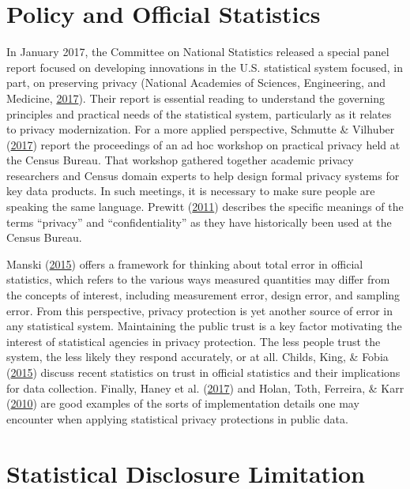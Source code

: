 \documentclass[]{article}
\begin{document}
\hypertarget{policy-and-official-statistics}{\section{Policy and
Official Statistics}\label{policy-and-official-statistics}}

In January 2017, the Committee on National Statistics released a special
panel report focused on developing innovations in the U.S. statistical
system focused, in part, on preserving privacy (National Academies of
Sciences, Engineering, and Medicine,
\protect\hyperlink{ref-groves:harris-kojetin:2017}{2017}). Their report
is essential reading to understand the governing principles and
practical needs of the statistical system, particularly as it relates to
privacy modernization. For a more applied perspective, Schmutte \&
Vilhuber (\protect\hyperlink{ref-Proc:NSF-Sloan:2017}{2017}) report the
proceedings of an ad hoc workshop on practical privacy held at the
Census Bureau. That workshop gathered together academic privacy
researchers and Census domain experts to help design formal privacy
systems for key data products. In such meetings, it is necessary to make
sure people are speaking the same language. Prewitt
(\protect\hyperlink{ref-prewitt:2011}{2011}) describes the specific
meanings of the terms ``privacy'' and ``confidentiality'' as they have
historically been used at the Census Bureau.

Manski (\protect\hyperlink{ref-Manski2014}{2015}) offers a framework for
thinking about total error in official statistics, which refers to the
various ways measured quantities may differ from the concepts of
interest, including measurement error, design error, and sampling error.
From this perspective, privacy protection is yet another source of error
in any statistical system. Maintaining the public trust is a key factor
motivating the interest of statistical agencies in privacy protection.
The less people trust the system, the less likely they respond
accurately, or at all. Childs, King, \& Fobia
(\protect\hyperlink{ref-Childs:Confidence:SP:2015}{2015}) discuss recent
statistics on trust in official statistics and their implications for
data collection. Finally, Haney et al.
(\protect\hyperlink{ref-HaneySIGMOD2017}{2017}) and Holan, Toth,
Ferreira, \& Karr (\protect\hyperlink{ref-Holan2010}{2010}) are good
examples of the sorts of implementation details one may encounter when
applying statistical privacy protections in public data.

\hypertarget{statistical-disclosure-limitation}{\section{Statistical
Disclosure Limitation}\label{statistical-disclosure-limitation}}
\end{document}
